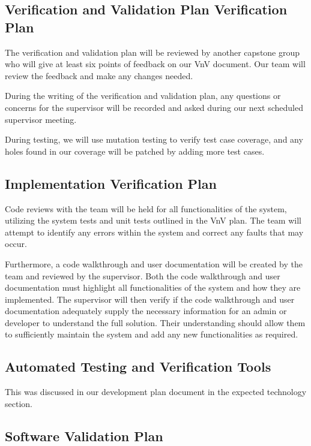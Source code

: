\documentclass[12pt, titlepage]{article}
\begin{document}
\subsection{Verification and Validation Plan Verification Plan}

The verification and validation plan will be reviewed by another capstone
group who will give at least six points of feedback on our VnV document. Our
team will review the feedback and make any changes needed. 

During the writing of the verification and validation plan, any questions or
concerns for the supervisor will be recorded and asked during our next
scheduled supervisor meeting.

During testing, we will use mutation testing to verify test case coverage, and
any holes found in our coverage will be patched by adding more test cases.

\subsection{Implementation Verification Plan}

Code reviews with the team will be held for all functionalities of the system, utilizing the
system tests and unit tests outlined in the VnV plan. The team will attempt to identify any
errors within the system and correct any faults that may occur.

Furthermore, a code walkthrough and user documentation will be created by the team and
reviewed by the supervisor. Both the code walkthrough and user documentation must highlight
all functionalities of the system and how they are implemented. The supervisor will then
verify if the code walkthrough and user documentation adequately supply the necessary
information for an admin or developer to understand the full solution. Their understanding
should allow them to sufficiently maintain the system and add any new functionalities as
required.

\subsection{Automated Testing and Verification Tools}

This was discussed in our development plan document \cite{DP} 
in the expected technology section.

\subsection{Software Validation Plan}
\end{document}
